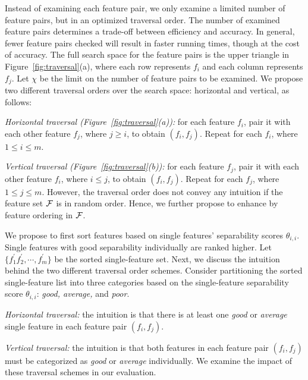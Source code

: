  Instead of examining each feature pair, we only examine a limited number of feature pairs, but in an optimized traversal order. The number of examined feature pairs determines a trade-off between efficiency and accuracy. In general, fewer feature pairs checked will result in faster running times, though at the cost of accuracy.
The full search space for the feature pairs is the upper triangle in Figure~\ref{fig:traversal}(a), where each row represents $f_i$ and each column represents $f_j$. Let $\chi$ be the limit on the number of feature pairs to be examined. We propose two different traversal orders over the search space: horizontal and vertical, as follows:
\squishlist
\item \emph{Horizontal traversal (Figure~\ref{fig:traversal}(a)):} for each feature $f_i$, pair it with each other feature $f_j$, where $j\geq i$, to obtain $(f_i,f_j)$. Repeat for each $f_i$, where $1 \leq i\leq m$.
\item \emph{Vertical traversal (Figure~\ref{fig:traversal}(b)):} for each feature $f_j$, pair it with each other feature $f_i$, where $i\leq j$, to obtain $(f_i,f_j)$. Repeat for each $f_j$, where $1 \leq j\leq m$.
\squishend
\noindent
However, the traversal order does not convey any intuition if the feature set ${\mathcal{F}}$ is in random order. Hence, we further propose to enhance \traversal by feature ordering in ${\mathcal{F}}$.

 We propose to first sort features based on single features' separability scores $\theta_{i,i}$. Single features with good separability individually are ranked higher. Let $\{f_1^{'} f_2^{'},\cdots,f_m^{'}\}$ be the sorted single-feature set. Next, we discuss the intuition behind the two different traversal order schemes. Consider partitioning the sorted single-feature list into three categories based on the single-feature separability score $\theta_{i,i}$: {\em good, average,} and {\em poor}.
\squishlist
\item \emph{Horizontal traversal:} the intuition is that there is at least one {\em good} or {\em average} single feature in each \topk feature pair $(f_i,f_j)$.
\item \emph{Vertical traversal:} the intuition is that both features in each \topk feature pair $(f_i,f_j)$ must be categorized as {\em good} or {\em average} individually.
\squishend
\noindent We examine the impact of these traversal schemes in our evaluation.

